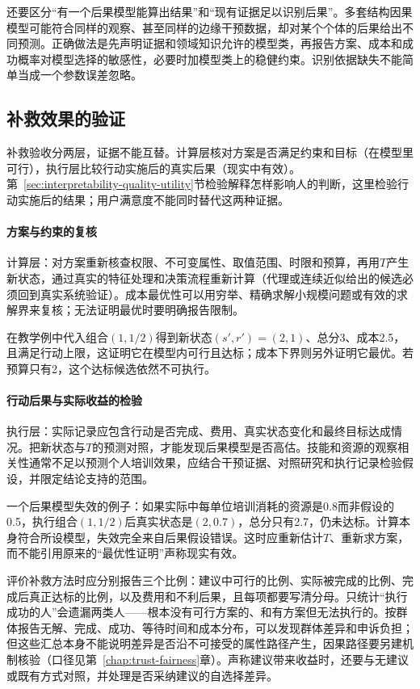 还要区分“有一个后果模型能算出结果”和“现有证据足以识别后果”。多套结构因果模型可能符合同样的观察、甚至同样的边缘干预数据，却对某个个体的后果给出不同预测。正确做法是先声明证据和领域知识允许的模型类，再报告方案、成本和成功概率对模型选择的敏感性，必要时加模型类上的稳健约束。识别依据缺失不能简单当成一个参数误差忽略。

\subsection{补救效果的验证}
\label{sec:interpretability-recourse-validation}

补救验收分两层，证据不能互替。计算层核对方案是否满足约束和目标（在模型里可行），执行层比较行动实施后的真实后果（现实中有效）。第~\ref{sec:interpretability-quality-utility}节检验解释怎样影响人的判断，这里检验行动实施后的结果；用户满意度不能同时替代这两种证据。

\paragraph{方案与约束的复核}

计算层：对方案重新核查权限、不可变属性、取值范围、时限和预算，再用$T$产生新状态，通过真实的特征处理和决策流程重新计算（代理或连续近似给出的候选必须回到真实系统验证）。成本最优性可以用穷举、精确求解小规模问题或有效的求解界来复核；无法证明最优时要明确报告限制。

在教学例中代入组合$(1,1/2)$得到新状态$(s',r')=(2,1)$、总分3、成本2.5，且满足行动上限，这证明它在模型内可行且达标；成本下界则另外证明它最优。若预算只有2，这个达标候选依然不可执行。

\paragraph{行动后果与实际收益的检验}

执行层：实际记录应包含行动是否完成、费用、真实状态变化和最终目标达成情况。把新状态与$T$的预测对照，才能发现后果模型是否高估。技能和资源的观察相关性通常不足以预测个人培训效果，应结合干预证据、对照研究和执行记录检验假设，并限定结论支持的范围。

一个后果模型失效的例子：如果实际中每单位培训消耗的资源是0.8而非假设的0.5，执行组合$(1,1/2)$后真实状态是$(2,0.7)$，总分只有2.7，仍未达标。计算本身符合所设模型，失效完全来自后果假设错误。这时应重新估计$T$、重新求方案，而不能引用原来的“最优性证明”声称现实有效。

评价补救方法时应分别报告三个比例：建议中可行的比例、实际被完成的比例、完成后真正达标的比例，以及费用和不利后果，且每项都要写清分母。只统计“执行成功的人”会遗漏两类人——根本没有可行方案的、和有方案但无法执行的。按群体报告无解、完成、成功、等待时间和成本分布，可以发现群体差异和申诉负担；但这些汇总本身不能说明差异是否沿不可接受的属性路径产生，因果路径要另建机制核验（口径见第~\ref{chap:trust-fairness}章）。声称建议带来收益时，还要与无建议或既有方式对照，并处理是否采纳建议的自选择差异。

